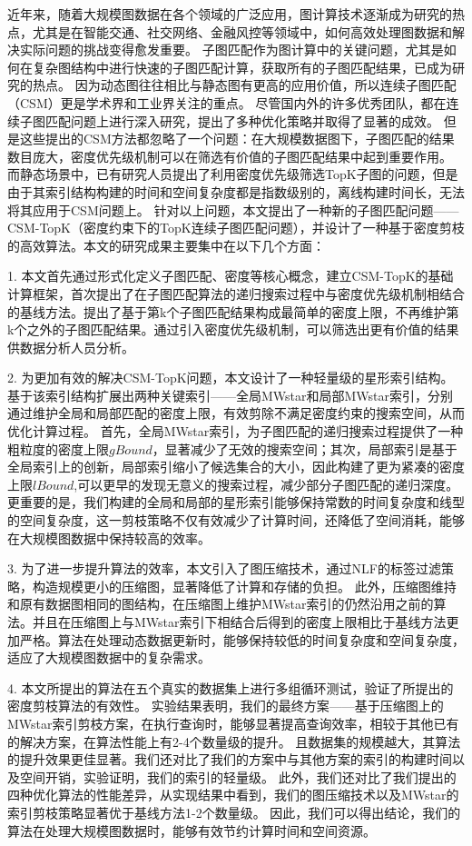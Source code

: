\begin{summary}
	近年来，随着大规模图数据在各个领域的广泛应用，图计算技术逐渐成为研究的热点，尤其是在智能交通、社交网络、金融风控等领域中，如何高效处理图数据和解决实际问题的挑战变得愈发重要。
	子图匹配作为图计算中的关键问题，尤其是如何在复杂图结构中进行快速的子图匹配计算，获取所有的子图匹配结果，已成为研究的热点。
	因为动态图往往相比与静态图有更高的应用价值，所以连续子图匹配（CSM）更是学术界和工业界关注的重点。
	尽管国内外的许多优秀团队，都在连续子图匹配问题上进行深入研究，提出了多种优化策略并取得了显著的成效。
	但是这些提出的CSM方法都忽略了一个问题：在大规模数据图下，子图匹配的结果数目庞大，密度优先级机制可以在筛选有价值的子图匹配结果中起到重要作用。
	而静态场景中，已有研究人员提出了利用密度优先级筛选TopK子图的问题，但是由于其索引结构构建的时间和空间复杂度都是指数级别的，离线构建时间长，无法将其应用于CSM问题上。
	针对以上问题，本文提出了一种新的子图匹配问题——CSM-TopK（密度约束下的TopK连续子图匹配问题），并设计了一种基于密度剪枝的高效算法。本文的研究成果主要集中在以下几个方面：
		
		1. 本文首先通过形式化定义子图匹配、密度等核心概念，建立CSM-TopK的基础计算框架，首次提出了在子图匹配算法的递归搜索过程中与密度优先级机制相结合的基线方法。提出了基于第k个子图匹配结果构成最简单的密度上限，不再维护第k个之外的子图匹配结果。通过引入密度优先级机制，可以筛选出更有价值的结果供数据分析人员分析。

		2.	为更加有效的解决CSM-TopK问题，本文设计了一种轻量级的星形索引结构。基于该索引结构扩展出两种关键索引——全局MWstar和局部MWstar索引，分别通过维护全局和局部匹配的密度上限，有效剪除不满足密度约束的搜索空间，从而优化计算过程。
		首先，全局MWstar索引，为子图匹配的递归搜索过程提供了一种粗粒度的密度上限$gBound$，显著减少了无效的搜索空间；其次，局部索引是基于全局索引上的创新，局部索引缩小了候选集合的大小，因此构建了更为紧凑的密度上限$lBound$,可以更早的发现无意义的搜索过程，减少部分子图匹配的递归深度。
		更重要的是，我们构建的全局和局部的星形索引能够保持常数的时间复杂度和线型的空间复杂度，这一剪枝策略不仅有效减少了计算时间，还降低了空间消耗，能够在大规模图数据中保持较高的效率。

		3. 为了进一步提升算法的效率，本文引入了图压缩技术，通过NLF的标签过滤策略，构造规模更小的压缩图，显著降低了计算和存储的负担。
		此外，压缩图维持和原有数据图相同的图结构，在压缩图上维护MWstar索引的仍然沿用之前的算法。并且在压缩图上与MWstar索引下相结合后得到的密度上限相比于基线方法更加严格。算法在处理动态数据更新时，能够保持较低的时间复杂度和空间复杂度，适应了大规模图数据中的复杂需求。
		
		4.	本文所提出的算法在五个真实的数据集上进行多组循环测试，验证了所提出的密度剪枝算法的有效性。
		实验结果表明，我们的最终方案——基于压缩图上的MWstar索引剪枝方案，在执行查询时，能够显著提高查询效率，相较于其他已有的解决方案，在算法性能上有2-4个数量级的提升。
		且数据集的规模越大，其算法的提升效果更佳显著。我们还对比了我们的方案中与其他方案的索引的构建时间以及空间开销，实验证明，我们的索引的轻量级。
		此外，我们还对比了我们提出的四种优化算法的性能差异，从实现结果中看到，我们的图压缩技术以及MWstar的索引剪枝策略显著优于基线方法1-2个数量级。
		因此，我们可以得出结论，我们的算法在处理大规模图数据时，能够有效节约计算时间和空间资源。
	

\end{summary}
